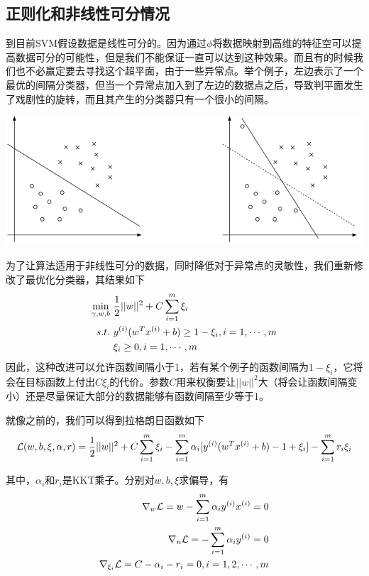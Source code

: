 \subsection{正则化和非线性可分情况}
到目前SVM假设数据是线性可分的。因为通过$\phi$将数据映射到高维的特征空可以提高数据可分的可能性，但是我们不能保证一直可以达到这种效果。而且有的时候我们也不必赢定要去寻找这个超平面，由于一些异常点。举个例子，左边表示了一个最优的间隔分类器，但当一个异常点加入到了左边的数据点之后，导致判平面发生了戏剧性的旋转，而且其产生的分类器只有一个很小的间隔。
\begin{center}
\includegraphics[scale=0.6]{../figures/SVM3.PNG} 
\end{center}

为了让算法适用于非线性可分的数据，同时降低对于异常点的灵敏性，我们重新修改了最优化分类器，其结果如下
\begin{eqnarray}
\begin{aligned}
\min_{\gamma,w,b}&\ \frac{1}{2}||w||^2+C\sum_{i=1}^m\xi_i\\
s.t.&\ {y}^{({i})}(w^T{x}^{({i})}+b)\geq 1-\xi_i,i=1,\cdots,m\\
&\ \xi_i\geq 0,i=1,\cdots,m
\end{aligned}
\end{eqnarray}
因此，这种改进可以允许函数间隔小于1，若有某个例子的函数间隔为$1-\xi_i$，它将会在目标函数上付出$C\xi_i$的代价。参数$C$用来权衡要让$||w||^2$大（将会让函数间隔变小）还是尽量保证大部分的数据能够有函数间隔至少等于1。

就像之前的，我们可以得到拉格朗日函数如下
\begin{eqnarray}
\mathcal{L}(w,b,\xi,\alpha,r)=\frac{1}{2}||w||^2+C\sum_{i=1}^m\xi_i-\sum_{i=1}^m\alpha_i[{y}^{({i})}(w^T{x}^{({i})}+b)-1+\xi_i]-\sum_{i=1}^mr_i\xi_i
\end{eqnarray}

其中，$\alpha_i$和$r_i$是KKT乘子。分别对$w,b,\xi$求偏导，有
\begin{eqnarray}
\nabla_w\mathcal{L}=w-\sum_{i=1}^m\alpha_i{y}^{({i})}{x}^{({i})}=0\\
\nabla_n\mathcal{L}=-\sum_{i=1}^m\alpha_i{y}^{({i})}=0\\
\nabla_{\xi_i}\mathcal{L}=C-\alpha_i-r_i=0,i=1,2,\cdots,m
\end{eqnarray}

